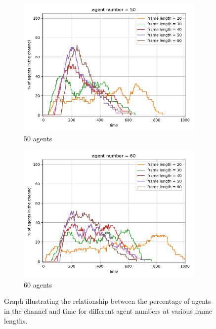 \begin{figure}[htbp]
    \vspace{1cm}
    
    \begin{subfigure}[t]{0.45\linewidth}
        \centering
        \includegraphics[width=\linewidth]{figures/channel_usage_agent50.png}
        \caption{50 agents}
        \label{fig:agentpercent5}
    \end{subfigure}
    \hfill
    \begin{subfigure}[t]{0.45\linewidth}
        \centering
        \includegraphics[width=\linewidth]{figures/channel_usage_agent60.png}
        \caption{60 agents}
        \label{fig:agentpercent6}
    \end{subfigure}
    
    \caption{Graph illustrating the relationship between the percentage of agents in the channel and time for different agent numbers at various frame lengths.}
    \label{fig:agentpercent}
\end{figure}


